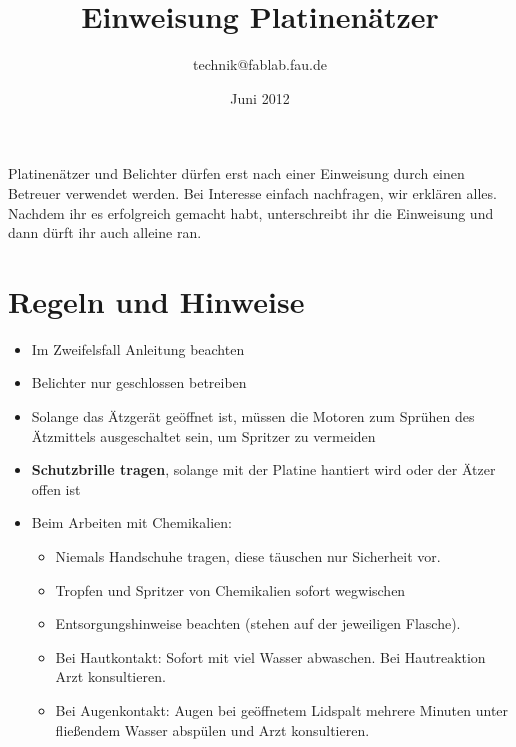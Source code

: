 \documentclass{\basedir/fablab-document}
\date{Juni 2012}
\author{technik@fablab.fau.de}
\title{Einweisung Platinenätzer}
\begin{document}
\dosecttoc %
\maketitle

Platinenätzer und Belichter dürfen erst nach einer Einweisung durch einen Betreuer verwen\-det werden. Bei Interesse einfach nachfragen, wir erklären alles. Nachdem ihr es erfolgreich gemacht habt, unterschreibt ihr die Einweisung und dann dürft ihr auch alleine ran.

\section[Regeln und Hinweise]{Regeln und Hinweise}
\begin{itemize}
\item Im Zweifelsfall Anleitung beachten
\item Belichter nur geschlossen betreiben
\item Solange das Ätzgerät geöffnet ist, müssen die Motoren zum Sprühen des Ätzmittels ausgeschaltet sein, um Spritzer zu vermeiden
\item \textbf{Schutzbrille tragen}, solange mit der Platine hantiert wird oder der Ätzer offen ist
\item Beim Arbeiten mit Chemikalien:

\begin{itemize}
\item Niemals Handschuhe tragen, diese täuschen nur Sicherheit vor.
\item Tropfen und Spritzer von Chemikalien sofort wegwischen
\item Entsorgungshinweise beachten (stehen auf der jeweiligen Flasche).
\item Bei Hautkontakt: Sofort mit viel Wasser abwaschen. Bei Hautreaktion Arzt konsultieren.
\item Bei Augenkontakt: Augen bei geöffnetem Lidspalt mehrere Minuten unter fließendem Wasser abspülen und Arzt konsultieren.
\end{itemize}
\end{itemize}

\newpage
\renewcommand{\contentsname}{Inhaltsverzeichnis / Arbeitsablauf}
\setcounter{tocdepth}{2}
\tableofcontents
\newpage
\end{document}
